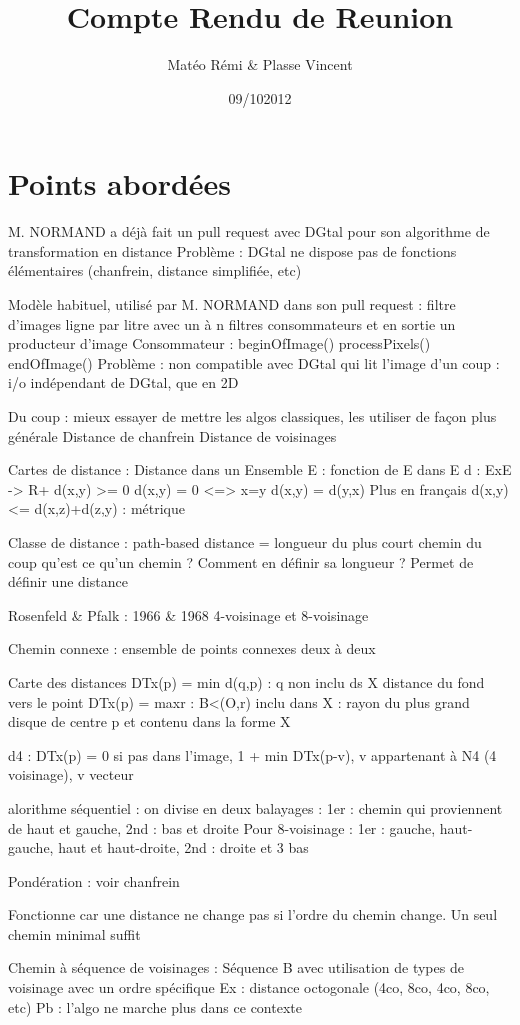\documentclass{article}
\title{Compte Rendu de Reunion}
\author{Matéo Rémi \& Plasse Vincent}
\date{09/102012}
\begin{document}
\maketitle

\section{Points abordées}
M. NORMAND a déjà fait un pull request avec DGtal pour son algorithme de transformation en distance
Problème : DGtal ne dispose pas de fonctions élémentaires (chanfrein, distance simplifiée, etc)

Modèle habituel, utilisé par M. NORMAND dans son pull request : filtre d'images ligne par litre avec un à n filtres consommateurs et en sortie un producteur d'image
Consommateur : beginOfImage()
	processPixels()
	endOfImage()
Problème : non compatible avec DGtal qui lit l'image d'un coup : i/o indépendant de DGtal, que en 2D

Du coup : mieux essayer de mettre les algos classiques, les utiliser de façon plus générale
Distance de chanfrein
Distance de voisinages

Cartes de distance :
Distance dans un Ensemble E : fonction de E dans E d : ExE -> R+
d(x,y) >= 0
d(x,y) = 0 <=> x=y
d(x,y) = d(y,x)
Plus en français d(x,y) <= d(x,z)+d(z,y) : métrique

Classe de distance : path-based
distance = longueur du plus court chemin
du coup
qu'est ce qu'un chemin ? Comment en définir sa longueur ?
Permet de définir une distance

Rosenfeld & Pfalk : 1966 & 1968
4-voisinage et 8-voisinage

Chemin connexe : ensemble de points connexes deux à deux

Carte des distances DTx(p) = min {d(q,p) : q non inclu ds X} distance du fond vers le point
DTx(p) = max{r : B<(O,r) inclu dans X} : rayon du plus grand disque de centre p et contenu dans la forme X

d4 : DTx(p) = 0 si pas dans l'image, 1 + min DTx(p-v), v appartenant à N4 (4 voisinage), v vecteur

alorithme séquentiel : on divise en deux balayages : 1er : chemin qui proviennent de haut et gauche, 2nd : bas et droite
Pour 8-voisinage :
1er : gauche, haut-gauche, haut et haut-droite, 
2nd : droite et 3 bas

Pondération : voir chanfrein

Fonctionne car une distance ne change pas si l'ordre du chemin change. Un seul chemin minimal suffit

Chemin à séquence de voisinages : Séquence B avec utilisation de types de voisinage avec un ordre spécifique
Ex : distance octogonale (4co, 8co, 4co, 8co, etc)
Pb : l'algo ne marche plus dans ce contexte

      
\end{document}
